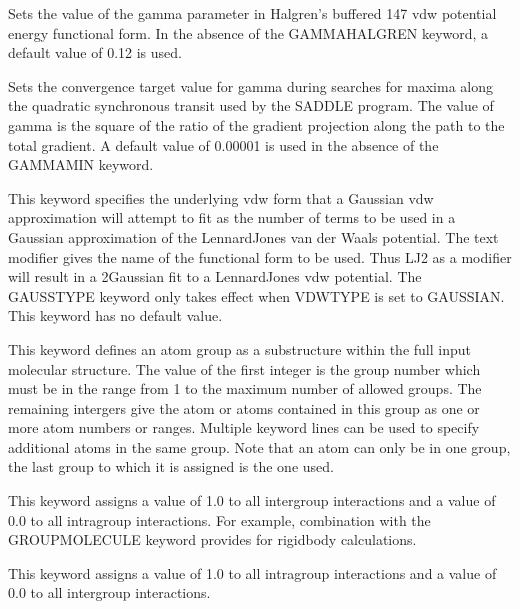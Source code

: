 \documentclass[letterpaper,11pt,english]{sphinxmanual}
\begin{document}
  Sets the value of the gamma parameter in Halgren’s buffered 14\sphinxhyphen{}7 vdw potential energy functional form. In the absence of the GAMMA\sphinxhyphen{}HALGREN keyword, a default value of 0.12 is used.

  Sets the convergence target value for gamma during searches for maxima along the quadratic synchronous transit used by the SADDLE program. The value of gamma is the square of the ratio of the gradient projection along the path to the total gradient. A default value of 0.00001 is used in the absence of the GAMMAMIN keyword.

  This keyword specifies the underlying vdw form that a Gaussian vdw approximation will attempt to fit as the number of terms to be used in a Gaussian approximation of the Lennard\sphinxhyphen{}Jones van der Waals potential. The text modifier gives the name of the functional form to be used. Thus LJ\sphinxhyphen{}2 as a modifier will result in a 2\sphinxhyphen{}Gaussian fit to a Lennard\sphinxhyphen{}Jones vdw potential. The GAUSSTYPE keyword only takes effect when VDWTYPE is set to GAUSSIAN. This keyword has no default value.

  This keyword defines an atom group as a substructure within the full input molecular structure. The value of the first integer is the group number which must be in the range from 1 to the maximum number of allowed groups. The remaining intergers give the atom or atoms contained in this group as one or more atom numbers or ranges. Multiple keyword lines can be used to specify additional atoms in the same group. Note that an atom can only be in one group, the last group to which it is assigned is the one used.

  This keyword assigns a value of 1.0 to all inter\sphinxhyphen{}group interactions and a value of 0.0 to all intra\sphinxhyphen{}group interactions. For example, combination with the GROUP\sphinxhyphen{}MOLECULE keyword provides for rigid\sphinxhyphen{}body calculations.

  This keyword assigns a value of 1.0 to all intra\sphinxhyphen{}group interactions and a value of 0.0 to all inter\sphinxhyphen{}group interactions.
\end{document}
